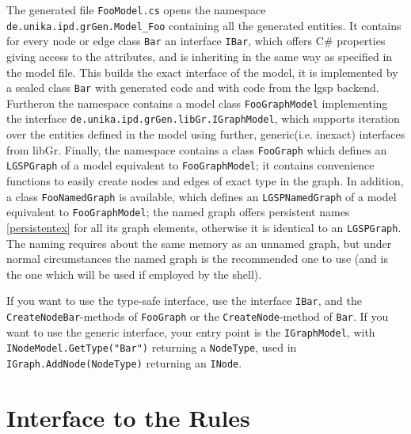 The generated file \texttt{FooModel.cs} opens the namespace \texttt{de.unika.ipd.grGen.Model\_Foo} containing all the generated entities.
It contains for every node or edge class \texttt{Bar} an interface \texttt{IBar}, which offers C\# properties giving access to the attributes, and is inheriting in the same way as specified in the model file.
This builds the exact interface of the model, it is implemented by a sealed class \texttt{Bar} with generated code and with code from the lgsp backend.
Furtheron the namespace contains a model class \texttt{FooGraphModel} implementing the interface \texttt{de.unika.ipd.grGen.libGr.IGraphModel},
which supports iteration over the entities defined in the model using further, generic(i.e. inexact) interfaces from libGr.
Finally, the namespace contains a class \texttt{FooGraph} which defines an \texttt{LGSPGraph} of a model equivalent to \texttt{FooGraphModel}; 
it contains convenience functions to easily create nodes and edges of exact type in the graph.
In addition, a class \texttt{FooNamedGraph} is available, which defines an \texttt{LGSPNamedGraph} of a model equivalent to \texttt{FooGraphModel}; 
the named graph offers persistent names \ref{persistentex} for all its graph elements, otherwise it is identical to an \texttt{LGSPGraph}.
The naming requires about the same memory as an unnamed graph, but under normal circumstances the named graph is the recommended one to use (and is the one which will be used if employed by the shell).

\begin{note}
If you want to use the type-safe interface, use the interface \texttt{IBar}, and the \texttt{CreateNodeBar}-methods of \texttt{FooGraph} or the \texttt{CreateNode}-method of \texttt{Bar}.
If you want to use the generic interface, your entry point is the \texttt{IGraphModel}, with \texttt{INodeModel.GetType("Bar")} returning a \texttt{NodeType}, used in \texttt{IGraph.AddNode(NodeType)} returning an \texttt{INode}.
\end{note}


\section{Interface to the Rules}

